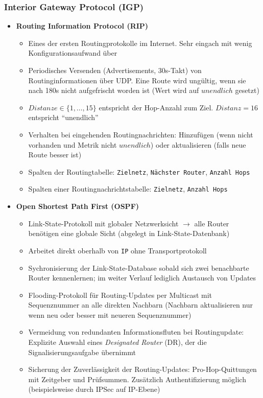 \subsubsection{Interior Gateway Protocol (IGP)}
\begin{itemize}
	\item \textbf{Routing Information Protocol (RIP)}
	\begin{itemize}
		\item Eines der ersten Routingprotokolle im Internet. Sehr eingach mit wenig Konfigurationsaufwand über
		\item Periodisches Versenden (Advertisements, 30s-Takt) von Routinginformationen über UDP. Eine Route wird ungültig, wenn sie nach 180s nicht aufgefrischt worden ist (Wert wird auf \(unendlich\) gesetzt)
		\item \(Distanze \in \{1,\dots,15\}\) entspricht der Hop-Anzahl zum Ziel. \(Distanz=16\) entspricht "`unendlich"'
		\item Verhalten bei eingehenden Routingnachrichten: Hinzufügen (wenn nicht vorhanden und Metrik nicht \(unendlich\)) oder aktualisieren (falls neue Route besser ist)
		\item Spalten der Routingtabelle: \texttt{Zielnetz}, \texttt{Nächster Router}, \texttt{Anzahl Hops}
		\item Spalten einer Routingnachrichtstabelle: \texttt{Zielnetz}, \texttt{Anzahl Hops}
	\end{itemize}
	\item \textbf{Open Shortest Path First (OSPF)}
	\begin{itemize}
		\item Link-State-Protokoll mit globaler Netzwerksicht \(\rightarrow\) alle Router benötigen eine globale Sicht (abgelegt in Link-State-Datenbank)
		\item Arbeitet direkt oberhalb von \texttt{IP} ohne Transportprotokoll
		\item Sychronisierung der Link-State-Database sobald sich zwei benachbarte Router kennenlernen; im weiter Verlauf lediglich Austausch von Updates
		\item Flooding-Protokoll für Routing-Updates per Multicast mit Sequenznummer an alle direkten Nachbarn (Nachbarn aktualisieren nur wenn neu oder besser mit neueren Sequenznummer)
		\item Vermeidung von redundanten Informationsfluten bei Routingupdate: Explizite Auswahl eines \textit{Designated Router} (DR), der die Signalisierungsaufgabe übernimmt
		\item Sicherung der Zuverlässigkeit der Routing-Updates: Pro-Hop-Quittungen mit Zeitgeber und Prüfsummen. Zusätzlich Authentifizierung möglich (beispielsweise durch IPSec auf IP-Ebene)

\end{itemize}
\end{itemize}
